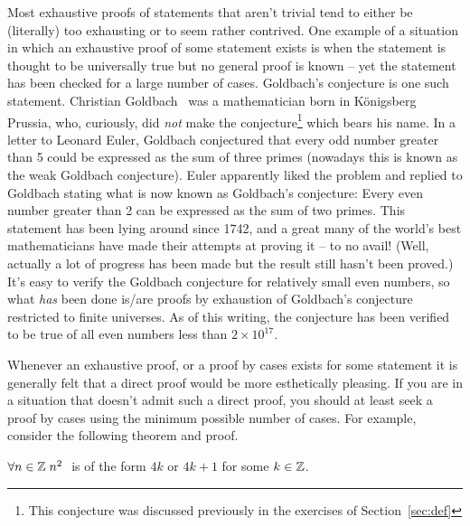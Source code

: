 Most exhaustive proofs of statements that aren't trivial tend to either be (literally) too exhausting or to seem rather contrived.  One example of a situation
in which an exhaustive proof of some statement exists is when the statement
is thought to be universally true but no general proof is known -- yet the
statement has been checked for a large number of cases.  
Goldbach's conjecture
is one such statement.  
Christian Goldbach~\cite{wiki-goldbach} 
was a mathematician born
in K\"{o}nigsberg Prussia, 
who, curiously, did \emph{not} make the
conjecture\footnote{This conjecture was %
discussed previously in the exercises of Section~\ref{sec:def}} which bears
his name.  In a letter to 
Leonard Euler, Goldbach conjectured that every
odd number greater than 5 could be expressed as the sum of three primes (nowadays this is known as the 
 weak Goldbach conjecture).  Euler apparently liked the 
problem and replied to Goldbach stating what is now known as Goldbach's 
conjecture: Every even number greater than 2 can be expressed as the sum of
two primes.  This statement has been lying around since 1742, and a great
many of the world's best mathematicians have made their attempts at proving it
-- to no avail! (Well, actually a lot of progress has been made but the result
still hasn't been proved.)  It's easy to verify the Goldbach conjecture for
relatively small even numbers, so what \emph{has} been done is/are proofs by
exhaustion of Goldbach's conjecture restricted to finite universes. 
As of this writing, the conjecture has been verified to be true of
all even numbers less than $2 \times 10^{17}$.      
 
Whenever an exhaustive proof, or a proof by cases exists for some statement
it is generally felt that a direct proof would be more esthetically pleasing.
If you are in a situation that doesn't admit such a direct proof, you should
at least seek a proof by cases using the minimum possible number of cases.
For example, consider the following theorem and proof.

\begin{thm} $\forall n \in {\mathbb Z} \; n^2 \;$ is of the form $4k$ or 
$4k+1$ for some $k \in {\mathbb Z}$.
\end{thm}


